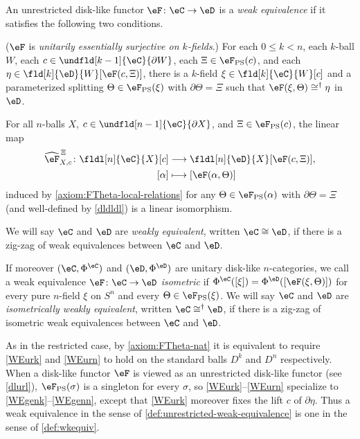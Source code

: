 \documentclass[12pt,reqno]{amsart}
\newcounter{alpha}\renewcommand\thealpha{\upshape\Alph{alpha}}
\newcommand{\psn}{\Phi}
\newcommand{\C}{\eC}
\newcommand{\D}{\eD}
\newcommand{\defn}[1]{\emph{#1}}
\renewcommand{\star}{\dag}
\begin{document}
\begin{definition}
\label{def:unrestricted-weak-equivalence}
An unrestricted disk-like functor $\eF\colon\C\to\D$ is a \defn{weak equivalence} if it satisfies the following two conditions.
\begin{lst}
  \item[(UWE$k$)]\label{WEurk}
  ($\eF$ is \defn{unitarily essentially surjective on $k$-fields}.)
  For each $0\leq k<n$, each $k$-ball $W$, each $c\in\undfld[k-1]{\C}{\partial W}$, each $\Xi\in\eF_{\mathrm{PS}}(c)$, and each $\eta\in\fld[k]{\D}{W}[\eF(c,\Xi)]$, there is a $k$-field $\xi\in\fld[k]{\C}{W}[c]$ and a parameterized splitting $\Theta\in\eF_{\mathrm{PS}}(\xi)$ with $\partial\Theta=\Xi$ such that $\eF(\xi,\Theta)\cong^\star\eta$ in $\D$.
  \item[(UWE$n$)]\label{WEurn}
  For all $n$-balls $X$, $c\in\undfld[n-1]{\C}{\partial X}$, and $\Xi\in\eF_{\mathrm{PS}}(c)$, the linear map
  \[
    \begin{aligned} 
    \widehat{\eF}^{\,\Xi}_{X,c}\colon\fldl[n]{\C}{X}[c]&\longrightarrow\fldl[n]{\D}{X}[\eF(c,\Xi)],
    \\
    [\alpha]&\longmapsto[\eF(\alpha,\Theta)]
    \end{aligned}
  \]
  induced by \ref{axiom:FTheta-local-relations} for any $\Theta\in\eF_{\mathrm{PS}}(\alpha)$ with $\partial\Theta=\Xi$ (and well-defined by \cref{dldldl}) is a linear isomorphism.
\end{lst}
We will say $\C$ and $\D$ are \defn{weakly equivalent}, written $\C\cong\D$, if there is a zig-zag of weak equivalences between $\C$ and $\D$.

If moreover $(\C,\psn^\C)$ and $(\D,\psn^\D)$ are unitary disk-like $n$-categories, we call a weak equivalence $\eF\colon\C\to\D$ \defn{isometric} if $\psn^\C([\xi])=\psn^\D([\eF(\xi,\Theta)])$ for every pure $n$-field $\xi$ on $S^n$ and every $\Theta\in\eF_{\mathrm{PS}}(\xi)$.
We will say $\C$ and $\D$ are \defn{isometrically weakly equivalent}, written $\C\cong^\star\D$, if there is a zig-zag of isometric weak equivalences between $\C$ and $\D$.
\end{definition}

\begin{remark}
\label{uresequvgen}
As in the restricted case, by \ref{axiom:FTheta-nat} it is equivalent to require \ref{WEurk} and \ref{WEurn} to hold on the standard balls $D^k$ and $D^n$ respectively. When a disk-like functor $\eF$ is viewed as an unrestricted disk-like functor (see \cref{dlurl}), $\eF_{\mathrm{PS}}(\sigma)$ is a singleton for every $\sigma$, so \ref{WEurk}--\ref{WEurn} specialize to \ref{WEgenk}--\ref{WEgenn}, except that \ref{WEurk} moreover fixes the lift $c$ of $\partial\eta$. Thus a weak equivalence in the sense of \cref{def:unrestricted-weak-equivalence} is one in the sense of \cref{def:wkequiv}.
\end{remark}
\end{document}
